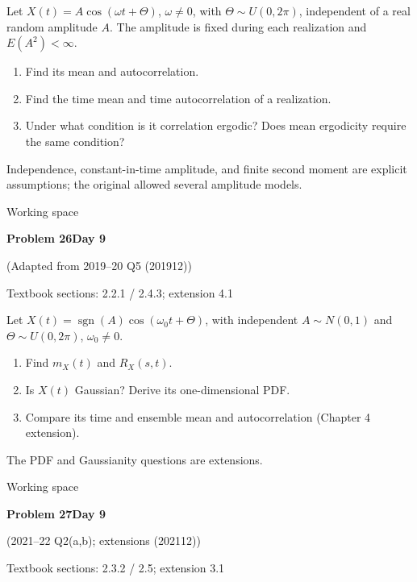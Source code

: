 \documentclass[11pt]{article}
\newcommand{\qtitle}[2]{\clearpage\begin{tcolorbox}[colback=navy,colframe=navy,arc=1.5pt,boxrule=0pt]\color{white}\large\bfseries #1\hfill\small #2\end{tcolorbox}}
\begin{document}
\begin{tcolorbox}[colback=qbg,colframe=qbg,boxrule=0pt]Let $X(t)=A\cos(\omega t+\Theta)$, $\omega\ne0$, with $\Theta\sim U(0,2\pi)$, independent of a real random amplitude $A$. The amplitude is fixed during each realization and $E(A^2)<\infty$.
\begin{enumerate}\item Find its mean and autocorrelation.\item Find the time mean and time autocorrelation of a realization.\item Under what condition is it correlation ergodic? Does mean ergodicity require the same condition?\end{enumerate}
Independence, constant-in-time amplitude, and finite second moment are explicit assumptions; the original allowed several amplitude models.
\end{tcolorbox}\smallskip\begin{workspace}\hfill{\color{linec}\footnotesize Working space}\end{workspace}
\qtitle{Problem 26}{Day 9}
{\small\color{accentred}(Adapted from 2019--20 Q5 (201912))}\par\smallskip
{\small\color{muted}Textbook sections: 2.2.1 / 2.4.3; extension 4.1}\par\medskip
\begin{tcolorbox}[colback=qbg,colframe=qbg,boxrule=0pt]Let $X(t)=\operatorname{sgn}(A)\cos(\omega_0t+\Theta)$, with independent $A\sim N(0,1)$ and $\Theta\sim U(0,2\pi)$, $\omega_0\ne0$.
\begin{enumerate}\item Find $m_X(t)$ and $R_X(s,t)$.\item Is $X(t)$ Gaussian? Derive its one-dimensional PDF.\item Compare its time and ensemble mean and autocorrelation (Chapter 4 extension).\end{enumerate}
The PDF and Gaussianity questions are extensions.
\end{tcolorbox}\smallskip\begin{workspace}\hfill{\color{linec}\footnotesize Working space}\end{workspace}
\qtitle{Problem 27}{Day 9}
{\small\color{accentred}(2021--22 Q2(a,b); extensions (202112))}\par\smallskip
{\small\color{muted}Textbook sections: 2.3.2 / 2.5; extension 3.1}\par\medskip
\end{document}
